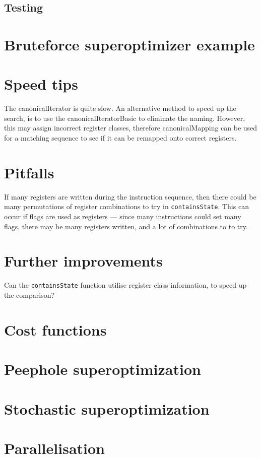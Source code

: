\documentclass{article}
\begin{document}

\subsection{Testing}

\section{Bruteforce superoptimizer example}


\section{Speed tips}

The canonicalIterator is quite slow. An alternative method to speed up the search, is to use the canonicalIteratorBasic to eliminate the naming. However, this may assign incorrect register classes, therefore canonicalMapping can be used for a matching sequence to see if it can be remapped onto correct registers.

\section{Pitfalls}

If many registers are written during the instruction sequence, then there could be many permutations of register combinations to try in \texttt{containsState}. This can occur if flags are used as registers --- since many instructions could set many flags, there may be many registers written, and a lot of combinations to to try.


\section{Further improvements}

Can the \texttt{containsState} function utilise register class information, to speed up the comparison?

\appendix
\section{Cost functions}

\section{Peephole superoptimization}


\section{Stochastic superoptimization}
\section{Parallelisation}
\end{document}
